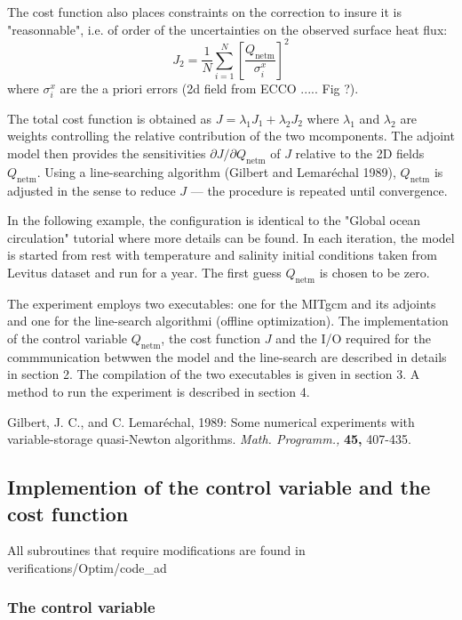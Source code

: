 The cost function also places constraints on the correction to insure it is
"reasonnable", i.e. of order of the uncertainties on the observed surface heat
flux: 
\begin{equation}
J_2 = \frac{1}{N} \sum_{i=1}^N \left[\frac{Q_\mathrm{netm}}{\sigma^x_i} \right]^2
\end{equation}
where $\sigma^x_i$ are the a priori errors (2d field from ECCO ..... Fig ?).

The total cost function is obtained as $J=\lambda_1 J_1+ \lambda_2 J_2$ where
$\lambda_1$ and $\lambda_2$ are weights controlling the relative contribution
of the two mcomponents. The adjoint model then provides the sensitivities
$\partial J/\partial Q_\mathrm{netm}$ of $J$ relative to the 2D fields
$Q_\mathrm{netm}$. Using a line-searching algorithm (Gilbert and Lemar\'{e}chal 1989),
$Q_\mathrm{netm}$ is adjusted in the sense to reduce $J$ --- the procedure is 
repeated until convergence.

In the following example, the configuration is identical to the "Global ocean circulation"
tutorial where more details can be found. In each iteration, the model is started from
rest with temperature and salinity initial conditions taken from Levitus dataset and run
for a year. The first guess $Q_\mathrm{netm}$ is chosen to be zero.

The experiment employs two executables: one for the MITgcm and its adjoints and 
one for the line-search algorithmi (offline optimization). The implementation of
the control variable $Q_\mathrm{netm}$, the cost function $J$ and the I/O required
for the commmunication betwwen the model and the line-search are described in details 
in section 2. The compilation of the two executables is given in section 3.
A method to run the experiment is described in section 4.

Gilbert, J. C., and C. Lemar\'echal, 1989: Some numerical experiments with
variable-storage quasi-Newton algorithms. \textit{Math. Programm.,}
\textbf{45,} 407-435.

\subsection{Implemention of the control variable and the cost function}

All subroutines that require modifications are found in verifications/Optim/code\_ad

\subsubsection{The control variable}

